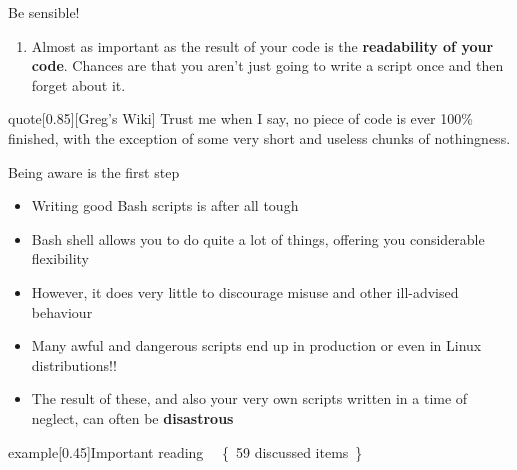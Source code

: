 \begin{frame}{Be sensible!}
{\begin{onlyenv}
\begin{enumerate}
                      \alert{Do not copy/paste from them!}
                \item Almost as important as the result of your code is the \textbf{readability of your code}.
                      Chances are that you aren't just going to write a script once and then forget about it.
            \end{enumerate}
            \begin{varblock}{quote}[0.85\textwidth]{}[Greg's Wiki]
                Trust me when I say, no piece of code is ever 100\% finished, with the exception of some very short and useless chunks of nothingness.
            \end{varblock}
        \end{onlyenv}
    }
\end{frame}
\begin{frame}{Being aware is the first step}
    \begin{itemize}
        \item Writing good Bash scripts is after all tough
        \item Bash shell allows you to do quite a lot of things, offering you considerable flexibility
        \item However, it does very little to discourage misuse and other ill-advised behaviour
        \item Many awful and dangerous scripts end up in production or even in Linux distributions!!
        \item The result of these, and also your very own scripts written in a time of neglect, can often be \textbf{disastrous}
    \end{itemize}
    \begin{varblock*}{example}[0.45\textwidth]{Important reading}
        $\quad${\tiny\{~59 discussed items~\}}\\
        \\
    \end{varblock*}
\end{frame}
